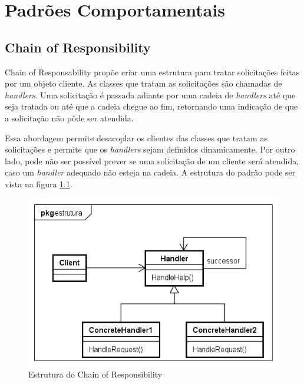 \chapter{Padrões Comportamentais}

\section{Chain of Responsibility}

Chain of Responsability propõe criar uma estrutura para 
tratar solicitações feitas por um objeto cliente. As classes 
que tratam as solicitações são chamadas de \textit{handlers}. 
Uma solicitação é passada adiante por uma cadeia de 
\textit{handlers} até que seja tratada ou 
até que a cadeia chegue ao fim, retornando uma 
indicação de que a solicitação não pôde ser atendida.

Essa abordagem permite desacoplar os clientes das classes 
que tratam as solicitações e permite que os \textit{handlers} 
sejam definidos dinamicamente. Por outro lado, pode não ser 
possível prever se uma solicitação de um cliente será atendida, 
caso um \textit{handler} adequado não esteja na cadeia. A 
estrutura do padrão pode ser vista na figura \ref{chain_struct}.

\begin{figure}[htb]
	\caption{\label{chain_struct}Estrutura do Chain of Responsibility}
	\begin{center}
	    \includegraphics[scale=0.5]{5_padroes-contexto-funcional/5.3_comportamentais/5.3.01_chain-of-responsibility/chainofresponsibility_struct.png}
	\end{center}
\end{figure}

